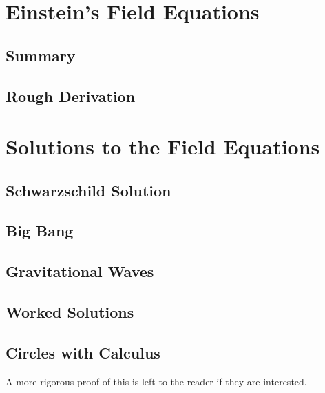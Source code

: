 \documentclass{memoir}
\begin{document}
\chapter{Einstein's Field Equations}
\section{Summary}
\section{Rough Derivation}
\chapter{Solutions to the Field Equations}
\section{Schwarzschild Solution}
\section{Big Bang}
\section{Gravitational Waves}

\section{Worked Solutions}






\begin{appendices}
\section{Circles with Calculus}

A more rigorous proof of this is left to the reader if they are interested.
\end{appendices}
\end{document}
